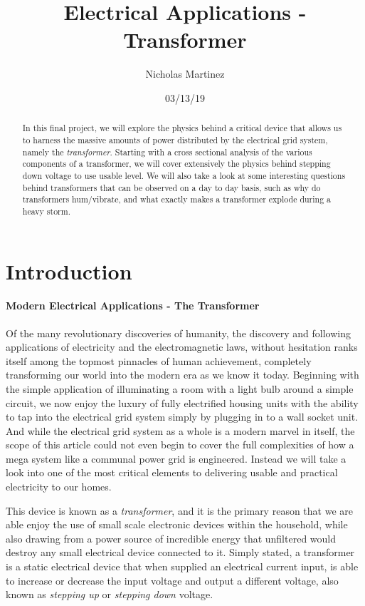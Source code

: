 \documentclass[12pt]{article}
\title{Electrical Applications - Transformer}
\author{Nicholas Martinez}
\date{03/13/19}
\begin{document}
	
\maketitle
	
\begin{abstract}
	In this final project, we will explore the physics behind a critical device that allows us to harness the massive amounts of power distributed by the electrical grid system, namely the \textit{transformer}. Starting with a cross sectional analysis of the various components of a transformer, we will cover extensively the physics behind stepping down voltage to use usable level. We will also take a look at some interesting questions behind transformers that can be observed on a day to day basis, such as why do transformers hum/vibrate, and what exactly makes a transformer explode during a heavy storm. 
	
\end{abstract} 

\section{Introduction}

\paragraph{Modern Electrical Applications - The Transformer}

Of the many revolutionary discoveries of humanity, the discovery and following applications of electricity and the electromagnetic laws, without hesitation ranks itself among the topmost pinnacles of human achievement, completely transforming our world into the modern era as we know it today. Beginning with the simple application of illuminating a room with a light bulb around a simple circuit, we now enjoy the luxury of fully electrified housing units with the ability to tap into the electrical grid system simply by plugging in to a wall socket unit. And while the electrical grid system as a whole is a modern marvel in itself, the scope of this article could not even begin to cover the full complexities of how a mega system like a communal power grid is engineered. Instead we will take a look into one of the most critical elements to delivering usable and practical electricity to our homes. 

This device is known as a \textit{transformer}, and it is the primary reason that we are able enjoy the use of small scale electronic devices within the household, while also drawing from a power source of incredible energy that unfiltered would destroy any small electrical device connected to it. Simply stated, a transformer is a static electrical device that when supplied an electrical current input, is able to increase or decrease the input voltage and output a different voltage, also known as \textit{stepping up} or \textit{stepping down} voltage. 
\end{document}
